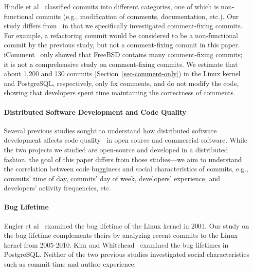 Hindle et al~\cite{largeCommits} classified commits into different categories,
one of which is non-functional commits (e.g., modification of comments,
documentation, etc.).  Our study differs from~\cite{largeCommits} in that we
specifically investigated comment-fixing commits. For example, a refactoring
commit would be considered to be a non-functional commit by the previous study,
but not a comment-fixing commit in this paper. iComment~\cite{iComment} only
showed that FreeBSD contains many comment-fixing commits; it is not a
comprehensive study on comment-fixing commits.  We estimate that about 1,200 and
130 commits (Section~\ref{sec-comment-only}) in the Linux kernel and PostgreSQL,
respectively, only fix comments, and do not modify the code, showing that
developers spent time maintaining the correctness of comments.

\paragraph{Distributed Software Development and Code Quality}

Several previous studies sought to understand how distributed software
development affects code quality~\cite{distributed09, organizational08,
  global06} in open source and commercial software. While the two projects we studied are open-source and developed in a distributed fashion, the
goal of this paper differs from those studies---we aim to understand
the correlation between code bugginess and social characteristics of commits,
e.g., commits' time of day, commits' day of week, developers' experience, and
developers' activity frequencies, etc.

\paragraph{Bug Lifetime}

Engler et al~\cite{deviant} examined the bug lifetime of the Linux kernel in
2001. Our study on the bug lifetime complements theirs by analyzing recent
commits to the Linux kernel from 2005-2010.  Kim and Whitehead~\cite{2006-long}
examined the bug lifetimes in PostgreSQL.  Neither of the two previous studies
investigated social characteristics such as commit time and author experience.


